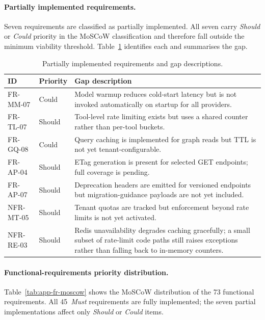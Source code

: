 \documentclass[a4paper,noexaminfo]{sapthesis}
\begin{document}
\paragraph{Partially implemented requirements.}
Seven requirements are classified as partially implemented.  All seven
carry \emph{Should} or \emph{Could} priority in the MoSCoW
classification and therefore fall outside the minimum viability
threshold.  Table~\ref{tab:app-partial-reqs} identifies each and
summarises the gap.

\begin{table}[ht]
\centering
\caption{Partially implemented requirements and gap descriptions.}
\label{tab:app-partial-reqs}
\small
\begin{tabularx}{\textwidth}{@{}l l X@{}}
    \hline
    \textbf{ID} & \textbf{Priority} & \textbf{Gap description} \\
    \hline
    FR-MM-07 & Could & Model warmup reduces cold-start latency but
        is not invoked automatically on startup for all providers. \\
    FR-TL-07 & Should & Tool-level rate limiting exists but uses a
        shared counter rather than per-tool buckets. \\
    FR-GQ-08 & Could & Query caching is implemented for graph reads
        but TTL is not yet tenant-configurable. \\
    FR-AP-04 & Should & ETag generation is present for selected GET
        endpoints; full coverage is pending. \\
    FR-AP-07 & Should & Deprecation headers are emitted for
        versioned endpoints but migration-guidance payloads are not
        yet included. \\
    NFR-MT-05 & Should & Tenant quotas are tracked but enforcement
        beyond rate limits is not yet activated. \\
    NFR-RE-03 & Should & Redis unavailability degrades caching
        gracefully; a small subset of rate-limit code paths still
        raises exceptions rather than falling back to in-memory
        counters. \\
    \hline
\end{tabularx}
\end{table}

\paragraph{Functional-requirements priority distribution.}
Table~\ref{tab:app-fr-moscow} shows the MoSCoW distribution of the 73
functional requirements.  All 45~\emph{Must} requirements are fully
implemented; the seven partial implementations affect only
\emph{Should} or \emph{Could} items.
\end{document}
